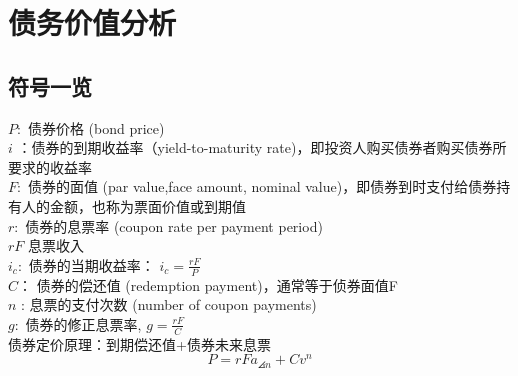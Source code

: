 \chapter{债务价值分析}
\section{符号一览}
\noindent $P:$ 债券价格 (bond price) \\
$i$ ：债券的到期收益率（yield-to-maturity rate)，即投资人购买债券者购买债券所要求的收益率\\
$F :$ 债券的面值 (par value,face amount, nominal value)，即债券到时支付给债券持有人的金额，也称为票面价值或到期值\\
$r:$ 债券的息票率 (coupon rate per payment period)\\
$rF$ 息票收入 \\
$i_{c}:$ 债券的当期收益率： $i_{c}=\frac{r F}{P}$\\
$C ：$ 债券的偿还值 (redemption payment)，通常等于侦券面值F\\
$n$ : 息票的支付次数 (number of coupon payments)\\
$g:$ 债券的修正息票率, $g=\frac{r F}{C}$\\
债券定价原理：到期偿还值+债券未来息票
$$P=rFa_{\angles{n}}+Cv^n$$